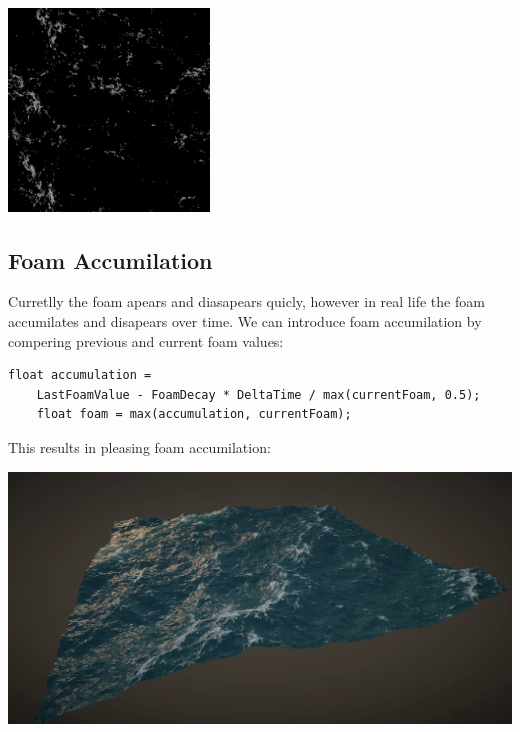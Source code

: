 \begin{minipage}{1\textwidth}
    \centering
    \includegraphics[width=0.40\textwidth]{"images/foam_texture.png"}
    \label{fig:foam_texture}
\end{minipage}

\subsection{Foam Accumilation}
Curretlly the foam apears and diasapears quicly, however in real life the foam accumilates and disapears over time.
We can introduce foam accumilation by compering previous and current foam values:
\begin{lstlisting}[caption={Foam Accumilation}, frame=single, numberstyle=\small\color{gray}, captionpos=b]
    float accumulation = 
    LastFoamValue - FoamDecay * DeltaTime / max(currentFoam, 0.5);
    float foam = max(accumulation, currentFoam);
\end{lstlisting}
This results in pleasing foam accumilation:
\begin{minipage}{1\textwidth}
    \centering
    \includegraphics[width=1.0\textwidth]{"images/ocean_with_foam.png"}
    \label{fig:ocean_with_foam}
\end{minipage}


